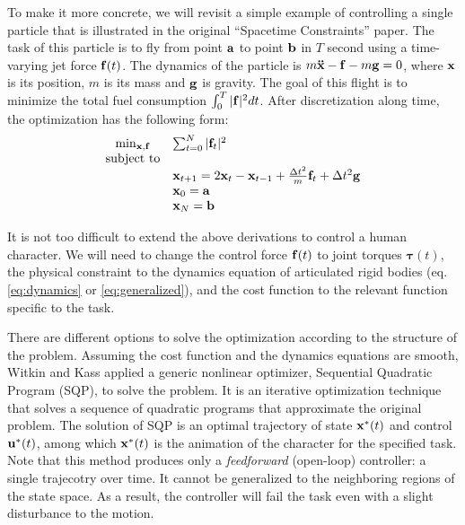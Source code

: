 To make it more concrete, we will revisit a simple example of controlling a single particle that is illustrated in the original ``Spacetime Constraints'' paper.
The task of this particle is to fly from point $\mathbf{a}$ to point $\mathbf{b}$ in $T$ second using a time-varying jet force $\mathbf{f}(t)$. The dynamics of the particle is $m\mathbf{\ddot{x}}-\mathbf{f}-m\mathbf{g}=0$, where $\mathbf{x}$ is its position, $m$ is its mass and $\mathbf{g}$ is gravity. The goal of this flight is to minimize the total fuel consumption $\int_0^T|\mathbf{f}|^2dt$. After discretization along time, the optimization has the following form:
\begin{displaymath}
  \begin{array}{cl}
    \min_{\mathbf{x},\mathbf{f}}&\sum_{t=0}^{N}|\mathbf{f}_t|^2\\
    \textrm{subject to}&\\
    &\mathbf{x}_{t+1}= 2\mathbf{x}_{t} -\mathbf{x}_{t-1}+\frac{\Delta t^2}{m}\mathbf{f}_t+\Delta t^2\mathbf{g}\\
    &\mathbf{x}_0=\mathbf{a}\\
    &\mathbf{x}_N=\mathbf{b}
  \end{array}
  \end{displaymath}

It is not too difficult to extend the above derivations to control a human character. We will need to change the control force $\mathbf{f}(t)$ to joint torques $\boldsymbol{\tau}(t)$, the physical constraint to the dynamics equation of articulated rigid bodies (eq. \ref{eq:dynamics} or \ref{eq:generalized}), and the cost function to the relevant function specific to the task.

There are different options to solve the optimization according to the structure of the problem. Assuming the cost function and the dynamics equations are smooth, Witkin and Kass \cite{Witkin:1988} applied a generic nonlinear optimizer, Sequential Quadratic Program (SQP), to solve the problem. It is an iterative optimization technique that solves a sequence of quadratic programs that approximate the original problem. The solution of SQP is an optimal trajectory of state $\mathbf{x}^*(t)$ and control $\mathbf{u}^*(t)$, among which $\mathbf{x}^*(t)$ is the animation of the character for the specified task. Note that this method produces only a \emph{feedforward} (open-loop) controller: a single trajecotry over time. It cannot be generalized to the neighboring regions of the state space. As a result, the controller will fail the task even with a slight disturbance to the motion.

